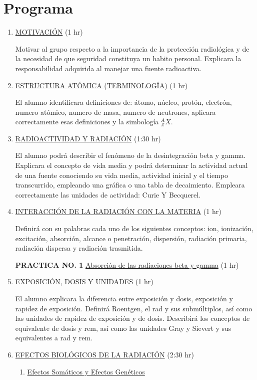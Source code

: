 \documentclass[11pt, oneside]{book}
\begin{document}
\section*{Programa}
\begin{enumerate}
  \item \ul{MOTIVACI\'ON} \hfill (1 hr)

    Motivar al grupo respecto a la importancia de la protección
    radiológica y de la necesidad de que seguridad constituya un habito
    personal. Explicara la responsabilidad adquirida al manejar una
    fuente radioactiva.
  \item \ul{ESTRUCTURA AT\'OMICA (TERMINOLOG\'IA)} \hfill (1 hr)

    El alumno identificara definiciones de: átomo, núcleo, protón,
    electrón, numero atómico, numero de masa, numero de neutrones,
    aplicara correctamente esas definiciones y la simbología ${}^A_ZX$.
  \item \ul{RADIOACTIVIDAD Y RADIACI\'ON} \hfill (1:30 hr)

    El alumno podrá describir el fenómeno de la desintegración beta y
    gamma. Explicara el concepto de vida media y podrá determinar la
    actividad actual de una fuente conociendo su vida media, actividad
    inicial y el tiempo transcurrido, empleando una gráfica o una tabla
    de decaimiento. Empleara correctamente las unidades de actividad:
    Curie Y Becquerel.

  \item \ul{INTERACCI\'ON DE LA RADIACI\'ON CON LA MATERIA} \hfill (1
    hr)

    Definirá con su palabras cada uno de los siguientes conceptos: ion,
    ionización, excitación, absorción, alcance o penetración,
    dispersión, radiación primaria, radiación dispersa y radiación
    trasmitida.

    \textbf{PRACTICA NO. 1} \ul{Absorci\'on de las radiaciones beta
    y gamma} \hfill (1 hr)

  \item \ul{EXPOSICI\'ON, DOSIS Y UNIDADES} \hfill (1 hr)

    El alumno explicara la diferencia entre exposición y dosis,
    exposición y rapidez de exposición. Definirá Roentgen, el rad y sus
    submúltiplos, así como las unidades de rapidez de exposición y de
    dosis. Describirá los conceptos de equivalente de dosis y rem, así
    como las unidades Gray y Sievert y sus equivalentes a rad y rem.

  \item \ul{EFECTOS BIOL\'OGICOS DE LA RADIACI\'ON} \hfill (2:30 hr)
    \begin{enumerate}[label*=\arabic*.]
      \item \ul{Efectos Som\'aticos y Efectos Gen\'eticos}


\end{enumerate}
\end{enumerate}
\end{document}
